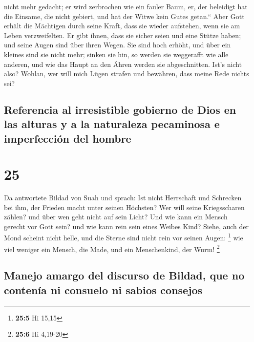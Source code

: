 nicht mehr gedacht; er wird zerbrochen wie ein fauler Baum,
 er, der beleidigt hat die Einsame, die nicht gebiert,
und hat der Witwe kein Gutes getan.``  Aber Gott erhält
die Mächtigen durch seine Kraft, dass sie wieder aufstehen, wenn sie am
Leben verzweifelten.  Er gibt ihnen, dass sie sicher
seien und eine Stütze haben; und seine Augen sind über ihren Wegen.
 Sie sind hoch erhöht, und über ein kleines sind sie
nicht mehr; sinken sie hin, so werden sie weggerafft wie alle anderen,
und wie das Haupt an den Ähren werden sie abgeschnitten. 
Ist's nicht also? Wohlan, wer will mich Lügen strafen und bewähren, dass
meine Rede nichts sei?

\hypertarget{referencia-al-irresistible-gobierno-de-dios-en-las-alturas-y-a-la-naturaleza-pecaminosa-e-imperfecciuxf3n-del-hombre}{%
\subsection{Referencia al irresistible gobierno de Dios en las alturas y
a la naturaleza pecaminosa e imperfección del
hombre}\label{referencia-al-irresistible-gobierno-de-dios-en-las-alturas-y-a-la-naturaleza-pecaminosa-e-imperfecciuxf3n-del-hombre}}

\hypertarget{section-24}{%
\section{25}\label{section-24}}

 Da antwortete Bildad von Suah und sprach: 
Ist nicht Herrschaft und Schrecken bei ihm, der Frieden macht unter
seinen Höchsten?  Wer will seine Kriegsscharen zählen? und
über wen geht nicht auf sein Licht?  Und wie kann ein
Mensch gerecht vor Gott sein? und wie kann rein sein eines Weibes Kind?
 Siehe, auch der Mond scheint nicht helle, und die Sterne
sind nicht rein vor seinen Augen: \footnote{\textbf{25:5} Hi 15,15}
 wie viel weniger ein Mensch, die Made, und ein
Menschenkind, der Wurm! \footnote{\textbf{25:6} Hi 4,19-20}

\hypertarget{manejo-amargo-del-discurso-de-bildad-que-no-contenuxeda-ni-consuelo-ni-sabios-consejos}{%
\subsection{Manejo amargo del discurso de Bildad, que no contenía ni
consuelo ni sabios
consejos}\label{manejo-amargo-del-discurso-de-bildad-que-no-contenuxeda-ni-consuelo-ni-sabios-consejos}}

